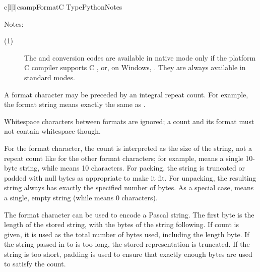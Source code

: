 \begin{tableiv}{c|l|l|c}{samp}{Format}{C Type}{Python}{Notes}
\end{tableiv}

\noindent
Notes:

\begin{description}
\item[(1)]
  The  and  conversion codes are available in
  native mode only if the platform C compiler supports C ,
  or, on Windows, .  They are always available in standard
  modes.
\end{description}


A format character may be preceded by an integral repeat count.  For
example, the format string  means exactly the same as
.

Whitespace characters between formats are ignored; a count and its
format must not contain whitespace though.

For the  format character, the count is interpreted as the
size of the string, not a repeat count like for the other format
characters; for example,  means a single 10-byte string, while
 means 10 characters.  For packing, the string is
truncated or padded with null bytes as appropriate to make it fit.
For unpacking, the resulting string always has exactly the specified
number of bytes.  As a special case,  means a single, empty
string (while  means 0 characters).

The  format character can be used to encode a Pascal
string.  The first byte is the length of the stored string, with the
bytes of the string following.  If count is given, it is used as the
total number of bytes used, including the length byte.  If the string
passed in to  is too long, the stored representation
is truncated.  If the string is too short, padding is used to ensure
that exactly enough bytes are used to satisfy the count.

